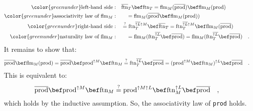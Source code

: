 \begin{align*}
{\color{greenunder}\text{left-hand side}:}\quad & \overline{\text{ftn}}_{T}\bef\text{ftn}_{T}=\text{flm}_{M}(\overline{\text{prod}})\bef\text{flm}_{M}(\text{prod})\\
{\color{greenunder}\text{associativity law of }\text{flm}_{M}:}\quad & \quad=\text{flm}_{M}(\overline{\text{prod}}\bef\text{flm}_{M}(\text{prod}))\\
{\color{greenunder}\text{right-hand side}:}\quad & \overset{?}{=}\text{ftn}_{T}^{\overline{\uparrow L}\uparrow M}\bef\overline{\text{ftn}}_{T}=\text{ftn}_{T}^{\overline{\uparrow L}\uparrow M}\bef\text{flm}_{M}(\overline{\text{prod}})\\
{\color{greenunder}\text{naturality law of }\text{flm}_{M}:}\quad & \quad=\text{flm}_{M}(\text{ftn}_{T}^{\overline{\uparrow L}}\bef\overline{\text{prod}})=\text{flm}_{M}(\text{ftn}_{T}^{\overline{\uparrow L}}\bef\overline{\text{prod}})\quad.
\end{align*}
It remains to show that:
\[
\overline{\text{prod}}\bef\text{flm}_{M}(\text{prod})=\overline{\text{prod}}\bef\text{prod}^{\uparrow M}\bef\text{ftn}_{M}\overset{?}{=}\text{ftn}_{T}^{\overline{\uparrow L}}\bef\overline{\text{prod}}=(\text{prod}^{\uparrow M}\bef\text{ftn}_{M})^{\uparrow L}\bef\overline{\text{prod}}\quad.
\]
This is equivalent to:
\[
\overline{\text{prod}}\bef\text{prod}^{\uparrow M}\bef\text{ftn}_{M}\overset{?}{=}\text{prod}^{\uparrow M\uparrow L}\bef\text{ftn}_{M}^{\uparrow L}\bef\overline{\text{prod}}\quad,
\]
which holds by the inductive assumption. So, the associativity law
of \lstinline!prod! holds.

